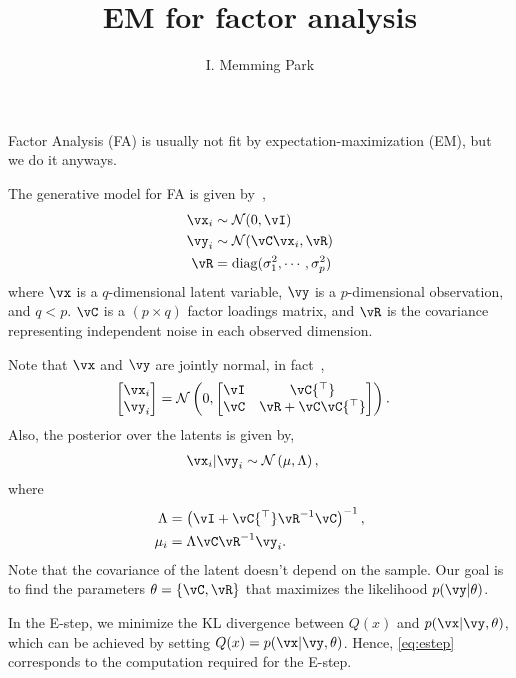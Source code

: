 \documentclass{article}
\title{EM for factor analysis}
\author{I. Memming Park}
\DeclareMathOperator{\diag}{diag}
\newcommand{\gaussian}{\ensuremath{\mathcal{N}}}
\newcommand{\trp}{{^\top}} %
\newcommand{\inv}{^{-1}}
\newcounter{ct}
\begin{document}
\maketitle
Factor Analysis (FA) is usually not fit by expectation-maximization (EM), but we do it anyways.

The generative model for FA is given by~\cite{Roweis1999},
\begin{align}\label{eq:model}
    \vx_i &\sim \gaussian(0, \vI)\nonumber\\
    \vy_i &\sim \gaussian(\vC\vx_i, \vR)\\
    \vR &= \diag(\sigma_1^2, \cdots, \sigma_p^2)\nonumber
\end{align}
where $\vx$ is a $q$-dimensional latent variable,
$\vy$ is a $p$-dimensional observation, and $q < p$.
$\vC$ is a $(p \times q)$ factor loadings matrix, and
$\vR$ is the covariance representing independent noise in each observed
dimension.

Note that $\vx$ and $\vy$ are jointly normal, in fact~\cite{Bishop2006},
\begin{align}
    \begin{bmatrix}
	\vx_i\\\vy_i
    \end{bmatrix}
    &=
    \gaussian\left(0, \begin{bmatrix}
	    \vI & \vC\trp\\
	    \vC & \vR + \vC\vC\trp
	\end{bmatrix}
    \right).
\end{align}
Also, the posterior over the latents is given by,
\begin{align}\label{eq:latent:posterior}
    \vx_i | \vy_i &\sim \gaussian\left(\mu, \Lambda\right),
\end{align}
where
\begin{align}
    \label{eq:estep}
    \Lambda &= \left(\vI + \vC\trp \vR\inv \vC\right)\inv,\nonumber\\
    \mu_i &= \Lambda \vC \vR\inv \vy_i.
\end{align}
Note that the covariance of the latent doesn't depend on the sample.
Our goal is to find the parameters $\theta = \{\vC, \vR\}$ that maximizes the
likelihood $p(\vy|\theta)$.

In the E-step, we minimize the KL divergence between $Q(x)$ and
$p(\vx|\vy,\theta)$, which can be achieved by setting $Q(x) =
p(\vx|\vy,\theta)$. Hence, \eqref{eq:estep} corresponds to the computation
required for the E-step.
\end{document}
